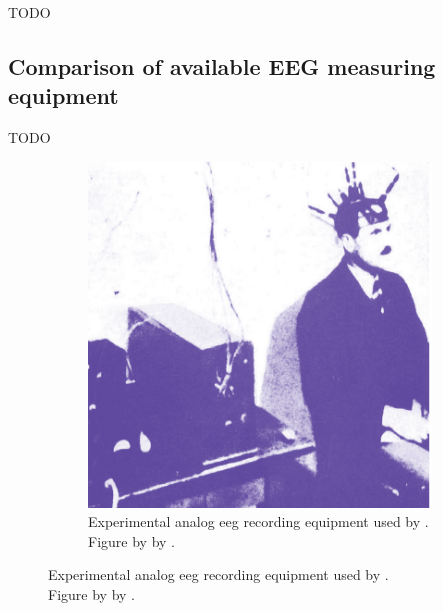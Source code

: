 TODO


\subsection{Comparison of available EEG measuring equipment}
\label{subsec:biomedical_signals_measuring_equipment}

TODO


\begin{figure}[ht]
  \begin{minipage}{\textwidth}
    \centering
    \begin{subfigure}{.48\textwidth}
        \centering
        \includegraphics[width=\textwidth]{images/hardware/berger_hardware.png}
        \captionsetup{width=0.9\linewidth}
        \captionsetup{justification=centering}
        \caption{Experimental analog \gls{eeg} recording equipment used by \citet{human_eeg_discovery}.\\Figure by by \citet{oldest_eeg_hardware}.}
        \label{fig:eeg_hardware_evolution_1}
    \end{subfigure}

\end{minipage}
\end{figure}
